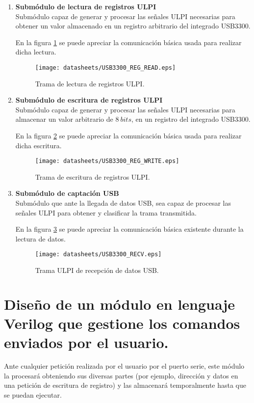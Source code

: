 \begin{enumerate}
    \item \textbf{Submódulo de lectura de registros ULPI} \\
    Submódulo capaz de generar y procesar las señales ULPI necesarias para obtener un valor almacenado en un registro arbitrario del integrado USB3300.
    
    En la figura \ref{fig:ULPI_REG_READ} se puede apreciar la comunicación básica usada para realizar dicha lectura.
    \begin{figure}[htb]
        \centering
        \texttt{[image: datasheets/USB3300\_REG\_READ.eps]}
        \caption{Trama de lectura de registros ULPI.}
        \label{fig:ULPI_REG_READ}
    \end{figure}
    
    \item \textbf{Submódulo de escritura de registros ULPI} \\
    Submódulo capaz de generar y procesar las señales ULPI necesarias para almacenar un valor arbitrario de $8~bits$, en un registro del integrado USB3300.
    
    En la figura \ref{fig:ULPI_REG_WRITE} se puede apreciar la comunicación básica usada para realizar dicha escritura.
    \begin{figure}[htb]
        \centering
        \texttt{[image: datasheets/USB3300\_REG\_WRITE.eps]}
        \caption{Trama de escritura de registros ULPI.}
        \label{fig:ULPI_REG_WRITE}
    \end{figure}
    
    \item \textbf{Submódulo de captación USB} \\
    Submódulo que ante la llegada de datos USB, sea capaz de procesar las señales ULPI para obtener y clasificar la trama transmitida.
    
    En la figura \ref{fig:ULPI_RECV} se puede apreciar la comunicación básica existente durante la lectura de datos.
    \begin{figure}[htb]
        \centering
        \texttt{[image: datasheets/USB3300\_RECV.eps]}
        \caption{Trama ULPI de recepción de datos USB.}
        \label{fig:ULPI_RECV}
    \end{figure}
\end{enumerate}

\section{Diseño de un módulo en lenguaje Verilog que gestione los comandos enviados por el usuario.}
Ante cualquier petición realizada por el usuario por el puerto serie, este módulo la procesará obteniendo sus diversas partes (por ejemplo, dirección y datos en una petición de escritura de registro) y las almacenará temporalmente hasta que se puedan ejecutar.

